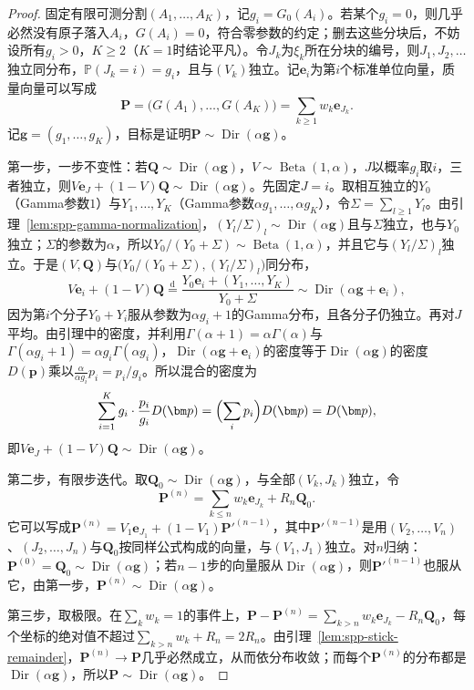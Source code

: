 \begin{proof}
固定有限可测分割$(A_1,\ldots,A_K)$，记$g_i=G_0(A_i)$。若某个$g_i=0$，则几乎必然没有原子落入$A_i$，$G(A_i)=0$，符合零参数的约定；删去这些分块后，不妨设所有$g_i>0$，$K\ge2$（$K=1$时结论平凡）。令$J_k$为$\xi_k$所在分块的编号，则$J_1,J_2,\ldots$独立同分布，$\mathbb P(J_k=i)=g_i$，且与$(V_k)$独立。记$\bm e_i$为第$i$个标准单位向量，质量向量可以写成
\[
  \bm P=\bigl(G(A_1),\ldots,G(A_K)\bigr)=\sum_{k\ge1}w_k\bm e_{J_k}.
\]
记$\bm g=(g_1,\ldots,g_K)$，目标是证明$\bm P\sim\operatorname{Dir}(\alpha\bm g)$。

第一步，一步不变性：若$\bm Q\sim\operatorname{Dir}(\alpha\bm g)$，$V\sim\operatorname{Beta}(1,\alpha)$，$J$以概率$g_i$取$i$，三者独立，则$V\bm e_J+(1-V)\bm Q\sim\operatorname{Dir}(\alpha\bm g)$。先固定$J=i$。取相互独立的$Y_0$（Gamma参数$1$）与$Y_1,\ldots,Y_K$（Gamma参数$\alpha g_1,\ldots,\alpha g_K$），令$\Sigma=\sum_{l\ge1}Y_l$。由引理~\ref{lem:spp-gamma-normalization}，$(Y_l/\Sigma)_l\sim\operatorname{Dir}(\alpha\bm g)$且与$\Sigma$独立，也与$Y_0$独立；$\Sigma$的参数为$\alpha$，所以$Y_0/(Y_0+\Sigma)\sim\operatorname{Beta}(1,\alpha)$，并且它与$(Y_l/\Sigma)_l$独立。于是$(V,\bm Q)$与$\bigl(Y_0/(Y_0+\Sigma),(Y_l/\Sigma)_l\bigr)$同分布，
\[
  V\bm e_i+(1-V)\bm Q\overset{\mathrm d}{=}\frac{Y_0\bm e_i+(Y_1,\ldots,Y_K)}{Y_0+\Sigma}\sim\operatorname{Dir}(\alpha\bm g+\bm e_i),
\]
因为第$i$个分子$Y_0+Y_i$服从参数为$\alpha g_i+1$的Gamma分布，且各分子仍独立。再对$J$平均。由引理中的密度，并利用$\Gamma(\alpha+1)=\alpha\Gamma(\alpha)$与$\Gamma(\alpha g_i+1)=\alpha g_i\Gamma(\alpha g_i)$，$\operatorname{Dir}(\alpha\bm g+\bm e_i)$的密度等于$\operatorname{Dir}(\alpha\bm g)$的密度$D(\bm p)$乘以$\frac{\alpha}{\alpha g_i}p_i=p_i/g_i$。所以混合的密度为
\[
  \sum_{i=1}^Kg_i\cdot\frac{p_i}{g_i}D(\bm p)=\Bigl(\sum_ip_i\Bigr)D(\bm p)=D(\bm p),
\]
即$V\bm e_J+(1-V)\bm Q\sim\operatorname{Dir}(\alpha\bm g)$。

第二步，有限步迭代。取$\bm Q_0\sim\operatorname{Dir}(\alpha\bm g)$，与全部$(V_k,J_k)$独立，令
\[
  \bm P^{(n)}=\sum_{k\le n}w_k\bm e_{J_k}+R_n\bm Q_0 .
\]
它可以写成$\bm P^{(n)}=V_1\bm e_{J_1}+(1-V_1)\bm P'^{(n-1)}$，其中$\bm P'^{(n-1)}$是用$(V_2,\ldots,V_n)$、$(J_2,\ldots,J_n)$与$\bm Q_0$按同样公式构成的向量，与$(V_1,J_1)$独立。对$n$归纳：$\bm P^{(0)}=\bm Q_0\sim\operatorname{Dir}(\alpha\bm g)$；若$n-1$步的向量服从$\operatorname{Dir}(\alpha\bm g)$，则$\bm P'^{(n-1)}$也服从它，由第一步，$\bm P^{(n)}\sim\operatorname{Dir}(\alpha\bm g)$。

第三步，取极限。在$\sum_kw_k=1$的事件上，$\bm P-\bm P^{(n)}=\sum_{k>n}w_k\bm e_{J_k}-R_n\bm Q_0$，每个坐标的绝对值不超过$\sum_{k>n}w_k+R_n=2R_n$。由引理~\ref{lem:spp-stick-remainder}，$\bm P^{(n)}\to\bm P$几乎必然成立，从而依分布收敛；而每个$\bm P^{(n)}$的分布都是$\operatorname{Dir}(\alpha\bm g)$，所以$\bm P\sim\operatorname{Dir}(\alpha\bm g)$。
\end{proof}

